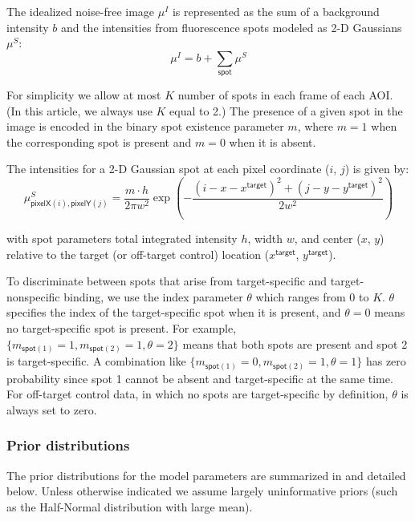 The idealized noise-free image $\mu^I$ is represented  as the sum of a background intensity $b$ and the intensities from fluorescence spots modeled as  2-D Gaussians $\mu^S$:
%
\begin{equation}
    \mu^I = b + \sum_{\mathsf{spot}} \mu^S
\end{equation}

\noindent
For simplicity we allow at most $K$ number of spots in each frame of each AOI.  (In this article, we always use $K$ equal to 2.)  The presence of a given spot in the image is encoded in the binary spot existence parameter $m$, where $m = 1$ when the corresponding spot is present and $m = 0$ when it is absent.

The intensities for a 2-D Gaussian spot at each pixel coordinate ($i$, $j$) is given by:
%
\begin{equation}
    \mu^S_{\mathsf{pixelX}(i), \mathsf{pixelY}(j)} = \dfrac{m \cdot h}{2 \pi w^2} \exp{\left( -\dfrac{(i-x-x^\mathsf{target})^2 + (j-y-y^\mathsf{target})^2}{2 w^2} \right)}
\end{equation}

\noindent
with spot parameters total integrated intensity $h$, width $w$, and center ($x$, $y$) relative to the target (or off-target control) location ($x^\mathsf{target}$, $y^\mathsf{target}$). 
%

To discriminate between spots that arise from target-specific and target-nonspecific binding, we use the index parameter $\theta$ which ranges from $0$ to $K$. $\theta$ specifies the index of the target-specific spot when it is present, and $\theta = 0$ means no target-specific spot is present. For example, $\{ m_{\mathsf{spot}(1)}=1, m_{\mathsf{spot}(2)}=1, \theta=2 \}$ means that both spots are present and spot 2 is target-specific. A combination like $\{ m_{\mathsf{spot}(1)}=0, m_{\mathsf{spot}(2)}=1, \theta=1 \}$ has zero probability since spot 1 cannot be absent and target-specific at the same time. For off-target control data, in which no spots are target-specific by definition, $\theta$ is always set to zero.
%

\subsubsection{Prior distributions}

The prior distributions for the model parameters are summarized in  and detailed below. Unless otherwise indicated we assume largely uninformative priors (such as the Half-Normal distribution with large mean). 

